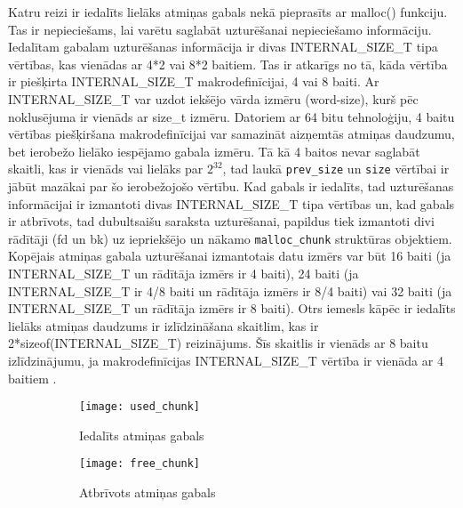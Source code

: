 Katru reizi ir iedalīts lielāks atmiņas gabals nekā pieprasīts ar malloc() funkciju.
Tas ir nepieciešams, lai varētu saglabāt uzturēšanai nepieciešamo informāciju. 
Iedalītam gabalam uzturēšanas informācija ir divas INTERNAL\_SIZE\_T tipa vērtības, kas vienādas ar 4*2 vai 8*2 baitiem. 
Tas ir atkarīgs no tā, kāda vērtība ir piešķirta INTERNAL\_SIZE\_T makrodefinīcijai, 4 vai 8 baiti.
Ar INTERNAL\_SIZE\_T var uzdot iekšējo vārda izmēru (word-size), kurš pēc noklusējuma ir vienāds ar size\_t izmēru.
Datoriem ar 64 bitu tehnoloģiju, 4 baitu vērtības piešķiršana makrodefinīcijai  var samazināt aizņemtās atmiņas daudzumu, bet ierobežo lielāko iespējamo gabala izmēru.
Tā kā 4 baitos nevar saglabāt skaitli, kas ir vienāds vai lielāks par \(2^{32}\), tad laukā \texttt{prev\_size} un \texttt{size} vērtībai ir jābūt mazākai par šo ierobežojošo vērtību.
Kad gabals ir iedalīts, tad uzturēšanas informācijai ir izmantoti divas INTERNAL\_SIZE\_T tipa vērtības un, kad gabals ir atbrīvots, tad  dubultsaišu saraksta uzturēšanai, papildus tiek izmantoti divi rādītāji (fd un bk) uz iepriekšējo un nākamo \texttt{malloc\_chunk} struktūras objektiem. 
Kopējais atmiņas gabala uzturēšanai izmantotais datu izmērs var būt 16 baiti (ja INTERNAL\_SIZE\_T un rādītāja izmērs ir 4 baiti), 24 baiti (ja INTERNAL\_SIZE\_T ir 4/8 baiti un rādītāja izmērs ir 8/4 baiti) vai 32 baiti (ja INTERNAL\_SIZE\_T un rādītāja izmērs ir 8 baiti).  
Otrs iemesls kāpēc ir iedalīts lielāks atmiņas daudzums ir izlīdzināšana skaitlim, kas ir  2*sizeof(INTERNAL\_SIZE\_T) reizinājums. Šīs skaitlis ir vienāds ar 8 baitu izlīdzinājumu, ja  makrodefinīcijas INTERNAL\_SIZE\_T vērtība  ir vienāda ar 4 baitiem \cite {MALLOC}.  

 \begin{figure}[h]
\begin{center}
\begin{subfigure}[t]{0.5\textwidth}
        \centering
        \texttt{[image: used\_chunk]}
        \caption{Iedalīts atmiņas gabals}
    \end{subfigure}%
\begin{subfigure}[t]{0.5\textwidth}
        \centering
        \texttt{[image: free\_chunk]}
        \caption{Atbrīvots atmiņas gabals}
    \end{subfigure}%
\end{center}
\caption{\textbf{\fontsize{11}{12}\selectfont {Atmiņas gabalu grafiskais struktūras attēlojums}}}
\label{fig:chunks}
\end{figure}


